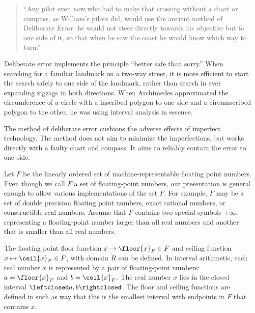 \begin{quote}
  ``Any pilot even now who had to make that crossing without a chart
  or compass, as William's pilots did, would use the ancient method of
  Deliberate Error: he would not steer directly towards his objective
  but to one side of it, so that when he saw the coast he would know
  which way to turn.'' \cite[p81]{How81}
\end{quote}

Deliberate error implements the principle ``better safe than sorry.''
When searching for a familiar landmark on a two-way street, it is more
efficient to start the search safely to one side of the landmark,
rather than search in ever expanding zigzags in both directions.  When
Archimedes approximated the circumference of a circle with a inscribed
polygon to one side and a circumscribed polygon to the other, he was
using interval analysis in essence.


The method of deliberate error cushions the adverse effects of
imperfect technology.  The method does not aim to minimize the
imperfections, but works directly with a faulty chart and compass.  It
aims to reliably contain the error to one side.


Let $F$ be the linearly ordered set of machine-representable floating
point numbers.  Even though we call $F$ a set of floating-point
numbers, our presentation is general enough to allow various
implementations of the set $F$.  For example, $F$ may be a set of
double precision floating point numbers, exact rational numbers, or
constructible real numbers.  Assume that $F$ contains two special
symbols $\pm\infty$, representing a floating-point number larger than
all real numbers and another that is smaller than all real numbers.

The floating point floor function $x\to\floor{x}_F\in
F$ and ceiling function $x\mapsto\ceil{x}_F\in F$, with domain
$\ring{R}$ can be defined.  In interval arithmetic, each real number
$x$ is represented by a pair of floating-point numbers:
$a=\floor{x}_F$ and $b=\ceil{x}_F$. The real number $x$ lies in the
closed interval $\leftclosed a,b\rightclosed$.  The floor and ceiling
functions are defined in such as way that this is the smallest interval with
endpoints in $F$ that contains $x$.

